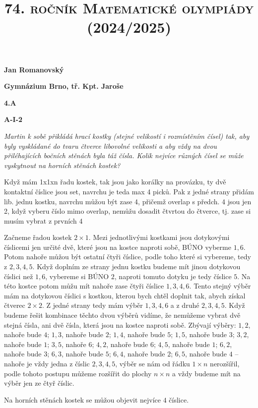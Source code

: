 \documentclass{article}
\title{\normalsize{\vspace{-2cm}\textsc{74. ročník Matematické olympiády (2024/2025)}\vspace{-1.7cm}}}
\date{}
\author{}
\begin{document}
\maketitle

\textbf{ }

\noindent \textbf{Jan Romanovský}

\noindent \textbf{Gymnázium Brno, tř. Kpt. Jaroše}

\noindent \textbf{4.A}

\noindent \textbf{A-\textrm{I}-2}

\textbf{ }

\textit{Martin k sobě přikládá hrací kostky (stejné velikostí i rozmístěním čísel) tak, aby byly vyskládané do tvaru čtverce libovolné velikosti a aby vždy na dvou přiléhajících bočních stěnách byla táž čísla. Kolik nejvíce různých čísel se může vyskytnout na horních stěnách kostek?}

\textbf{ }

Když mám 1x1xn řadu kostek, tak jsou jako korálky na provázku, ty dvě kontaktní číslice jsou set, navrchu je teda max 4 picků. Pak z jedné strany přidám lib. jednu kostku, navrchu můžou být zase 4, přičemž overlap s předch. 4 jsou jen 2, když vyberu číslo mimo overlap, nemůžu dosadit čtvrtou do čtverce, tj. zase si musím vybrat z prvních 4

Začneme řadou kostek $2 \times 1$. Mezi jednotlivými kostkami jsou dotykovými číslicemi jen určité dvě, které jsou na kostce naproti sobě, BÚNO vyberme $1, 6$. Potom nahoře můžou být ostatní čtyři číslice, podle toho které si vybereme, tedy z $2, 3, 4, 5$. Když doplním ze strany jednu kostku budeme mít jinou dotykovou číslici než $1, 6$, vybereme si BÚNO $2$, naproti tomuto dotyku je tedy číslice $5$. Na této kostce potom můžu mít nahoře zase čtyři číslice $1, 3, 4, 6$. Tento stejný výběr mám na dotykovou číslici s kostkou, kterou bych chtěl doplnit tak, abych získal čtverec $2 \times 2$. Z jedné strany tedy mám výběr $1,3,4,6$ a z druhé $2,3,4,5$. Když budeme řešit kombinace těchto dvou výběrů vidíme, že nemůžeme vybrat dvě stejná čísla, ani dvě čísla, která jsou na kostce naproti sobě. Zbývají výběry: $1,2$, nahoře bude $4$; $1,3$, nahoře bude $2$; $1,4$, nahoře bude $5$; $1,5$, nahoře bude $3$; $3,2$, nahoře bude $1$; $3,5$, nahoře $6$; $4,2$, nahoře bude $6$; $4 ,5$, nahoře bude $1$; $6,2$, nahoře bude $3$; $6,3$, nahoře bude $5$; $6,4$, nahoře bude $2$; $6,5$, nahoře bude $4$ -- nahoře je vždy jedna z číslic $2, 3, 4, 5$, výběr se nám od řádku $1 \times n$ nerozšířil, podle tohoto postupu můžeme rozšířit do plochy $n \times n$ a vždy budeme mít na výběr jen ze čtyř číslic.

Na horních stěnách kostek se můžou objevit nejvíce $4$ číslice.
\end{document}
